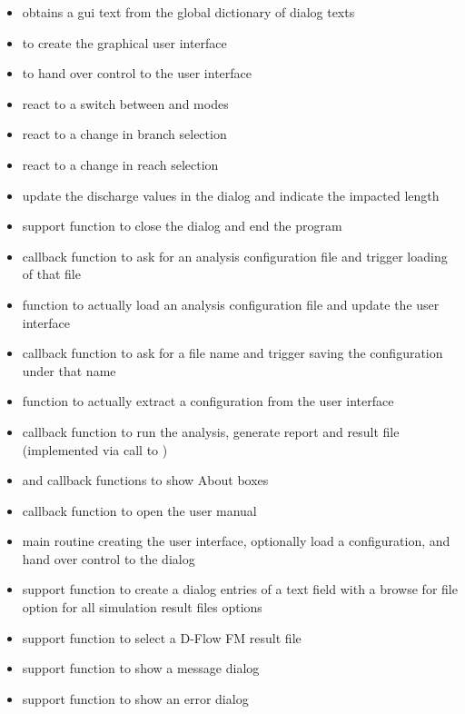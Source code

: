 \begin{itemize}
\item {} obtains a gui text from the global dictionary of dialog texts
\item {} to create the graphical user interface
\item {} to hand over control to the user interface
\item {} react to a switch between  and  modes
\item {} react to a change in branch selection
\item {} react to a change in reach selection
\item {} update the discharge values in the dialog and indicate the impacted length
\item {} support function to close the dialog and end the program
\item {} callback function to ask for an analysis configuration file and trigger loading of that file
\item {} function to actually load an analysis configuration file and update the user interface
\item {} callback function to ask for a file name and trigger saving the configuration under that name
\item {} function to actually extract a configuration from the user interface
\item {} callback function to run the analysis, generate report and result file (implemented via call to )
\item {} and  callback functions to show About boxes
\item {} callback function to open the user manual
\item {} main routine creating the user interface, optionally load a configuration, and hand over control to the dialog

\item {} support function to create a dialog entries of a text field with a browse for file option for all simulation result files options
\item {} support function to select a D-Flow FM result file
\item {} support function to show a message dialog
\item {} support function to show an error dialog
\end{itemize}


